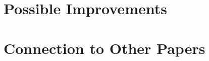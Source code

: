 \documentclass[english]{article}
\begin{document}
\section*{Possible Improvements}

\section*{Connection to Other Papers}



\end{document}
